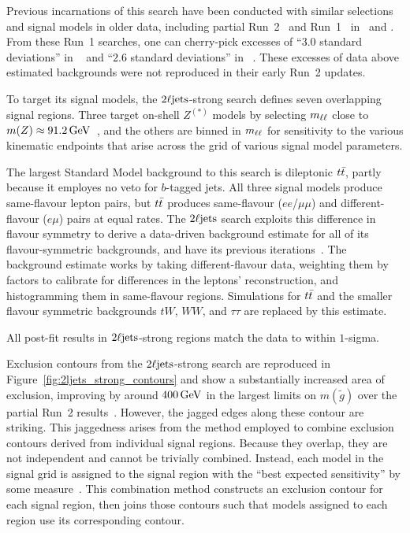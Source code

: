 Previous incarnations of this search have been conducted with similar
selections and signal models in older data, including partial Run~2~\cite{
atlas_susy_strong_2l_partial_run2_1,
atlas_susy_strong_2l_partial_run2,
cms_susy_2016_strong_2l_run2_1,
cms_susy_2016_strong_2l_run2
} and Run~1~\cite{
atlas_susy_strong_2l_run1,
cms_susy_2016_strong_2l_run1
} in \atlas\ and \cms.
From these Run~1 searches, one can cherry-pick excesses
of ``$3.0$ standard deviations'' in \atlas\ \cite{atlas_susy_strong_2l_run1}
and ``$2.6$ standard deviations'' in \cms~\cite{cms_susy_2016_strong_2l_run1}.
These excesses of data above estimated backgrounds were not reproduced in their
early Run~2 updates.

To target its signal models, the $\twoljets$-strong search defines seven
overlapping signal regions.
Three target on-shell $Z^{(*)}$ models by selecting $\mll$ close to
$m(Z)\approx 91.2\,\eV[G]$~\cite{pdg2022ynf},
and the others are binned in $\mll$ for sensitivity to the various
kinematic endpoints that arise across the grid of various signal model
parameters.

The largest Standard Model background to this search is dileptonic $\ttbar$,
partly because it employes no veto for $b$-tagged jets.
All three signal models produce same-flavour lepton pairs, but $\ttbar$
produces same-flavour ($ee$/$\mu\mu$) and different-flavour ($e\mu$) pairs at
equal rates.
The $\twoljets$ search exploits this difference in flavour symmetry to derive
a data-driven background estimate for all of its flavour-symmetric backgrounds,
and have its previous iterations~\cite{cms_susy_2016_strong_2l_run2_1}.
The background estimate works by taking different-flavour data, weighting them
by factors to calibrate for differences in the leptons' reconstruction, and
histogramming them in same-flavour regions.
Simulations for $\ttbar$ and the smaller flavour symmetric backgrounds
$tW$, $WW$, and $\tau\tau$ are replaced by this estimate.

All post-fit results in $\twoljets$-strong regions match the data to within
$1$-sigma.

Exclusion contours from the $\twoljets$-strong search are reproduced in
Figure~\ref{fig:2ljets_strong_contours} and show a substantially increased
area of exclusion, improving by around $400\,\eV[G]$ in the largest limits on
$m(\tilde g)$ over the partial Run~2
results~\cite{atlas_susy_strong_2l_partial_run2}.
However, the jagged edges along these contour are striking.
This jaggedness arises from the method employed to combine exclusion contours
derived from individual signal regions.
Because they overlap, they are not independent and cannot be trivially
combined.
Instead, each model in the signal grid is assigned to the signal region
with the ``best expected sensitivity'' by some
measure~\cite{atlas2022searches}.
This combination method constructs an exclusion contour for each signal region,
then joins those contours such that models assigned to each region use its
corresponding contour.

